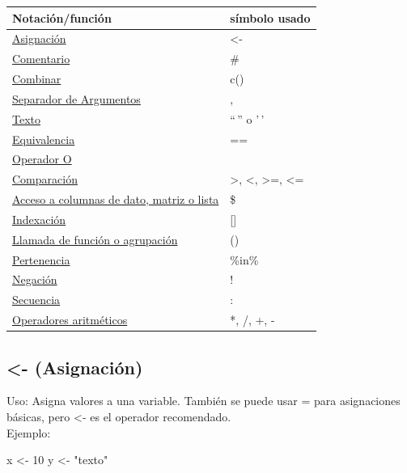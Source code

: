 \documentclass[
]{book}
\newenvironment{Shaded}{\begin{snugshade}}{\end{snugshade}}
\newcommand{\DecValTok}[1]{\textcolor[rgb]{0.00,0.00,0.81}{#1}}
\newcommand{\NormalTok}[1]{#1}
\newcommand{\OtherTok}[1]{\textcolor[rgb]{0.56,0.35,0.01}{#1}}
\newcommand{\StringTok}[1]{\textcolor[rgb]{0.31,0.60,0.02}{#1}}
\begin{document}
\begin{longtable}[]{@{}ll@{}}
\toprule\noalign{}
Notación/función & símbolo usado \\
\midrule\noalign{}
\endhead
\bottomrule\noalign{}
\endlastfoot
\protect\hyperlink{asignaciuxf3n}{Asignación} & \textless- \\
\protect\hyperlink{comentario}{Comentario} & \# \\
\protect\hyperlink{combinar}{Combinar} & c() \\
\protect\hyperlink{separador}{Separador de Argumentos} & , \\
\protect\hyperlink{texto}{Texto} & ``\,'' o '\,' \\
\protect\hyperlink{equivalencia}{Equivalencia} & == \\
\protect\hyperlink{OR}{Operador O} & \textbar{} \\
\protect\hyperlink{comparaciuxf3n}{Comparación} & \textgreater, \textless, \textgreater=, \textless= \\
\protect\hyperlink{acceso}{Acceso a columnas de dato, matriz o lista} & \$ \\
\protect\hyperlink{indexaciuxf3n}{Indexación} & {[}{]} \\
\protect\hyperlink{llamada}{Llamada de función o agrupación} & () \\
\protect\hyperlink{pertenencia}{Pertenencia} & \%in\% \\
\protect\hyperlink{negaciuxf3n}{Negación} & ! \\
\protect\hyperlink{secuencia}{Secuencia} & : \\
\protect\hyperlink{aritmeticos}{Operadores aritméticos} & *, /, +, - \\
\end{longtable}

\hypertarget{asignaciuxf3n}{%
\subsection{\textless- (Asignación)}\label{asignaciuxf3n}}

Uso: Asigna valores a una variable. También se puede usar = para asignaciones básicas, pero \textless- es el operador recomendado.\\
Ejemplo:

\begin{Shaded}
\begin{Highlighting}[]
\NormalTok{x }\OtherTok{\textless{}{-}} \DecValTok{10}
\NormalTok{y }\OtherTok{\textless{}{-}} \StringTok{"texto"}
\end{Highlighting}
\end{Shaded}
\end{document}
